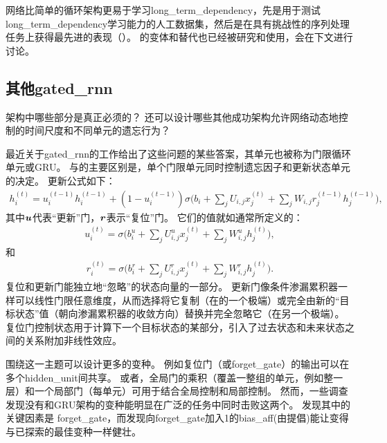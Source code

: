 
网络比简单的循环架构更易于学习\gls{long_term_dependency}，先是用于测试\gls{long_term_dependency}学习能力的人工数据集\citep{Bengio-trnn94,Hochreiter+Schmidhuber-1997,chapter-gradient-flow-2001}，然后是在具有挑战性的序列处理任务上获得最先进的表现（\citep{Graves-book2012,Graves-arxiv2013,Sutskever-et-al-NIPS2014}）。
的变体和替代也已经被研究和使用，会在下文进行讨论。

\subsection{其他\gls{gated_rnn}}
\label{sec:other_gated_rnns}
架构中哪些部分是真正必须的？
还可以设计哪些其他成功架构允许网络动态地控制的时间尺度和不同单元的遗忘行为？

最近关于\gls{gated_rnn}的工作给出了这些问题的某些答案，其单元也被称为门限循环单元或GRU\citep{cho-al-arxiv14-ssst8,Chung-et-al-NIPSDL2014-small,chung-icml15-gated,Jozefowicz-et-al-ICML2015,Chrupala-et-al-arxiv2015}。
与的主要区别是，单个门限单元同时控制遗忘因子和更新状态单元的决定。
更新公式如下：
\begin{align}
 h_i^{(t)} = u_i^{(t-1)} h_i^{(t-1)} + (1 - u_i^{(t-1)}) \sigma 
 \Big( b_i + \sum_j U_{i,j} x_j^{(t)} + \sum_j W_{i,j} r_j^{(t-1)} h_j^{(t-1)} \Big),
\end{align}
其中$\boldsymbol{\mathit{u}}$代表``更新''门，$\boldsymbol{\mathit{r}}$表示``复位''门。
它们的值就如通常所定义的：
\begin{align}
 u_i^{(t)} = \sigma \Big( b_i^u + \sum_j U_{i,j}^u x_j^{(t)} + \sum_j W_{i,j}^u h_j^{(t)} \Big),
\end{align}
和
\begin{align}
 r_i^{(t)} = \sigma \Big( b_i^r + \sum_j U_{i,j}^r x_j^{(t)} + \sum_j W_{i,j}^r h_j^{(t)} \Big).
\end{align}
复位和更新门能独立地``忽略''的状态向量的一部分。
更新门像条件渗漏累积器一样可以线性门限任意维度，从而选择将它复制（在的一个极端）或完全由新的``目标状态''值（朝向渗漏累积器的收敛方向）替换并完全忽略它（在另一个极端）。
复位门控制状态用于计算下一个目标状态的某部分，引入了过去状态和未来状态之间的关系附加非线性效应。


围绕这一主题可以设计更多的变种。
例如复位门（或\gls{forget_gate}）的输出可以在多个\gls{hidden_unit}间共享。
或者，全局门的乘积（覆盖一整组的单元，例如整一层）和一个局部门（每单元）可用于结合全局控制和局部控制。
然而，一些调查发现没有和GRU架构的变种能明显在广泛的任务中同时击败这两个\citep{Greff-et-al-arxiv2015,Jozefowicz-et-al-ICML2015}。
\cite{Greff-et-al-arxiv2015}发现其中的关键因素是
\gls{forget_gate}，而\cite{Jozefowicz-et-al-ICML2015}发现向\gls{forget_gate}加入1的\gls{bias_aff}(由\cite{Gers-et-al-2000}提倡)能让变得与已探索的最佳变种一样健壮。


